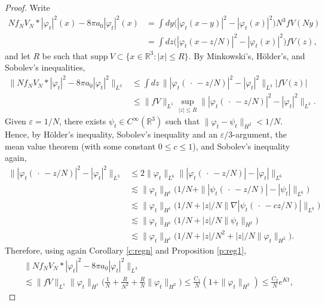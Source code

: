\documentclass[11pt,a4paper,DIV11]{scrartcl}	%
\newcommand{\R}{\mathds{R}}
\begin{document}
\begin{proof}
  Write
  \begin{align*}
    N f_N V_N * |\varphi_t|^2(x) - 8 \pi a_0 |\varphi_t|^2(x) & = \int dy
    \big( |\varphi_t(x-y)|^2 - |\varphi_t(x)|^2 \big) N^3 fV(Ny) \\
    & = \int dz \big( |\varphi_t(x-z/N)|^2 - |\varphi_t(x)|^2 \big) fV(z),
  \end{align*}
  and let $R$ be such that $\text{supp} \ V \subset \{ x \in \R^3 : |x| \le
  R \}$. By Minkowski's, H\"older's, and Sobolev's inequalities,
  \begin{align*}
    \| N f_N V_N * |\varphi_t|^2 - 8 \pi a_0 |\varphi_t|^2 \|_{L^3} & \le
    \int dz \, \| |\varphi_t(\, \cdot \, -z/N)|^2 - |\varphi_t|^2 \|_{L^3}
    |fV(z)| \\
    & \le \| fV \|_{L^1} \sup_{|z| \le R} \| |\varphi_t(\, \cdot \, -
    z/N)|^2 - |\varphi_t|^2 \|_{L^3}.
  \end{align*}
  Given $\varepsilon = 1/N$, there exists $\psi_t \in C^\infty(\R^3)$ such
  that $\| \varphi_t - \psi_t \|_{H^2} < 1/N$. Hence, by H\"older's
  inequality, Sobolev's inequality and an $\varepsilon/3$-argument, the mean
  value theorem (with some constant $0 \le c \le 1$), and Sobolev's
  inequality again,
  \begin{align*}
    \| |\varphi_t(\, \cdot \, - z/N)|^2 - |\varphi_t|^2 \|_{L^3} & \le 2 \|
    \varphi_t \|_{L^6} \| |\varphi_t(\, \cdot \, - z/N)| - |\varphi_t|
    \|_{L^6} \\
    & \apprle \| \varphi_t \|_{H^1} \big( 1/N + \| |\psi_t(\, \cdot \, - z/N)|
    - |\psi_t| \|_{L^6} \big) \\
    & \apprle \| \varphi_t \|_{H^1} \big( 1/N + |z|/N \| \nabla |\psi_t(\,
    \cdot \, - c z/N)| \|_{L^6} \big) \\
    & \apprle \| \varphi_t \|_{H^1} \big( 1/N + |z|/N \| \psi_t \|_{H^2}
    \big) \\
    & \apprle \| \varphi_t \|_{H^1} \big( 1/N + |z|/N^2 + |z|/N \| \varphi_t
    \|_{H^2} \big).
  \end{align*}
  Therefore, using again Corollary \ref{c:regn} and Proposition \ref{p:reg1},
  \begin{align*}
    & \| N f_N V_N * |\varphi_t|^2 - 8 \pi a_0 |\varphi_t|^2 \|_{L^3} \\
    & \apprle \| fV \|_{L^1} \| \varphi_t \|_{H^1} \Big( \frac{1}{N} +
    \frac{R}{N^2} + \frac{R}{N} \| \varphi_t \|_{H^2} \Big) \le
    \frac{C_1}{N}(1 + \| \varphi_t \|_{H^2}) \le \frac{C_2}{N} e^{Kt},
  \end{align*}

\end{proof}
\end{document}

